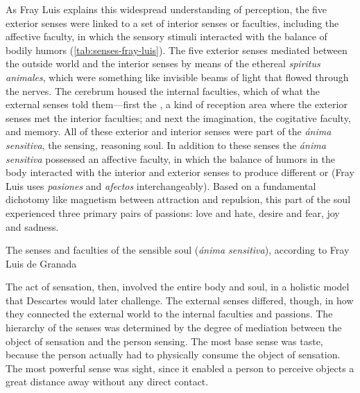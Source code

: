 As Fray Luis explains this widespread understanding of perception, the five
exterior senses were linked to a set of interior senses or faculties, including
the affective faculty, in which the sensory stimuli interacted with the balance
of bodily humors (\cref{tab:senses-fray-luis}).%
    \Autocite
    [, ]
    {LuisdeGranada-Balcells:SimboloPtI}
The five exterior senses mediated between the outside world and the interior
senses by means of the ethereal \emph{spiritus animales}, which were something
like invisible beams of light that flowed through the nerves.  
The cerebrum housed the internal faculties, which  of what
the external senses told them---first the , a kind of
reception area where the exterior senses met the interior faculties; and next
the imagination, the cogitative faculty, and memory.
All of these exterior and interior senses were part of the \emph{ánima
sensitiva}, the sensing, reasoning soul.
In addition to these senses the \emph{ánima sensitiva} possessed an affective
faculty, in which the balance of humors in the body interacted with the interior
and exterior senses to produce different  or 
(Fray Luis uses \emph{pasiones} and \emph{afectos} interchangeably).
Based on a fundamental dichotomy like magnetism between attraction and
repulsion, this  part of the soul experienced three
primary pairs of passions: love and hate, desire and fear, joy and sadness.

\begin{table}
    \caption{The senses and faculties of the sensible soul (\emph{ánima
    sensitiva}), according to Fray Luis de Granada}
    
    \label{tab:senses-fray-luis}
\end{table}

The act of sensation, then, involved the entire body and soul, in a holistic
model that Descartes would later challenge.  
The external senses differed, though, in how they connected the external world
to the internal faculties and passions.
The hierarchy of the senses was determined by the degree of mediation between
the object of sensation and the person sensing.
The most base sense was taste, because the person actually had to physically
consume the object of sensation.
The most powerful sense was sight, since it enabled a person to perceive objects
a great distance away without any direct contact.

